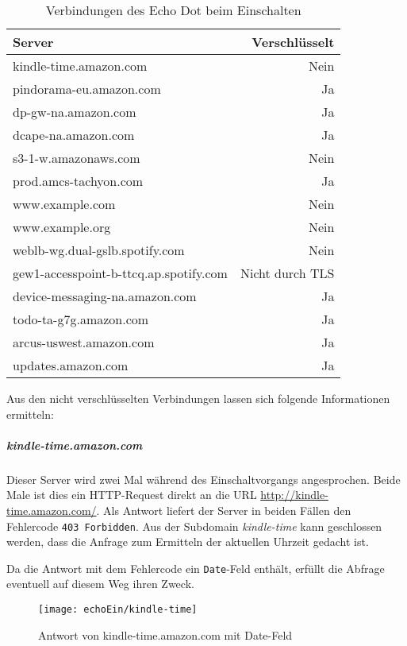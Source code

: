 \begin{table}[ht!]
    \centering
    \begin{tabular}{|l|r|}
        \hline
        \textbf{Server} & \textbf{Verschlüsselt} \\
        \hline
        kindle-time.amazon.com & Nein \\
        \hline
        pindorama-eu.amazon.com & Ja \\
        \hline
        dp-gw-na.amazon.com & Ja \\
        \hline
        dcape-na.amazon.com & Ja \\
        \hline
        s3-1-w.amazonaws.com & Nein \\
        \hline
        prod.amcs-tachyon.com & Ja \\
        \hline
        www.example.com & Nein \\
        \hline
        www.example.org & Nein \\
        \hline
        weblb-wg.dual-gslb.spotify.com & Nein \\
        \hline
        gew1-accesspoint-b-ttcq.ap.spotify.com & Nicht durch TLS \\
        \hline
        device-messaging-na.amazon.com & Ja \\
        \hline
        todo-ta-g7g.amazon.com & Ja \\
        \hline
        arcus-uswest.amazon.com & Ja \\
        \hline
        updates.amazon.com & Ja \\
        \hline
    \end{tabular}
    \caption{Verbindungen des Echo Dot beim Einschalten}
    \label{tab:verbindungenEchoDot}
\end{table}




Aus den nicht verschlüsselten Verbindungen lassen sich folgende Informationen ermitteln:

\subparagraph{kindle-time.amazon.com}
Dieser Server wird zwei Mal während des Einschaltvorgangs angesprochen.
Beide Male ist dies ein HTTP-Request direkt an die URL \url{http://kindle-time.amazon.com/}.
Als Antwort liefert der Server in beiden Fällen den Fehlercode \texttt{403 Forbidden}.
Aus der Subdomain \textit{kindle-time} kann geschlossen werden,
dass die Anfrage zum Ermitteln der aktuellen Uhrzeit gedacht ist.

Da die Antwort mit dem Fehlercode ein \texttt{Date}-Feld enthält,
erfüllt die Abfrage eventuell auf diesem Weg ihren Zweck.
\begin{figure}[h!]
    \centering
    \texttt{[image: echoEin/kindle-time]}
    \caption{Antwort von kindle-time.amazon.com mit Date-Feld}\label{fig:echo-ein-start}
\end{figure}


